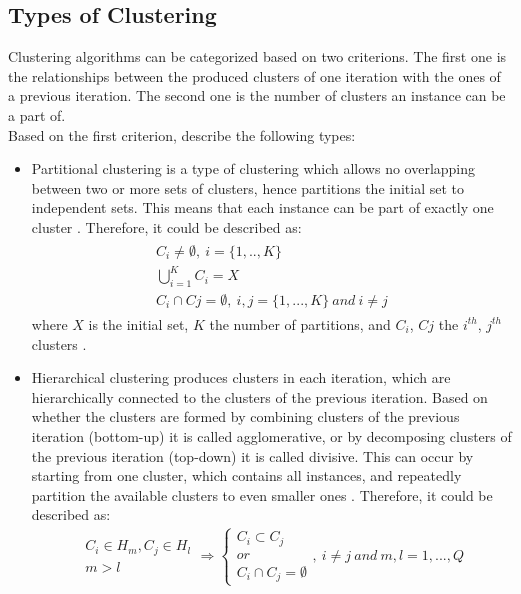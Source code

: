 \subsection{Types of Clustering}
Clustering algorithms can be categorized based on two criterions. The first one is the relationships between the produced clusters of one iteration with the ones of a previous iteration. The second one is the number of clusters an instance can be a part of. \\
Based on the first criterion, \textcite{tanSteinKum} describe the following types: \\
\begin{itemize}
\item Partitional clustering is a type of clustering which allows no overlapping between two or more sets of clusters, hence partitions the initial set to independent sets. This means that each instance can be part of exactly one cluster \autocite[492]{tanSteinKum}. Therefore, it could be described as:
\begin{eqnarray*}
\begin{array}{c}
C_{i} \neq \emptyset, \: i = \{1,..,K\} \\[4pt]
\bigcup_{i=1}^{K} C_{i}=X \\[4pt]
C_{i} \cap C{j} = \emptyset, \: i,j=\{1, ...,K\} \: and \: i \neq j
\end{array}
\end{eqnarray*}
where \(X\) is the initial set, \(K\) the number of partitions, and \(C_{i}\), \(C{j}\) the \(i^{th}\), \(j^{th}\) clusters \autocite[645]{survey}.
\item Hierarchical clustering produces clusters in each iteration, which are hierarchically connected to the clusters of the previous iteration. Based on whether the clusters are formed by combining clusters of the previous iteration (bottom-up) it is called agglomerative, or by decomposing clusters of the previous iteration (top-down) it is called divisive. This can occur by starting from one cluster, which contains all instances, and repeatedly partition the available clusters to even smaller ones \autocite[492]{tanSteinKum}. Therefore, it could be described as:
\begin{eqnarray*}
\left.\begin{array}{c}
C_{i} \in H_{m}, C_{j} \in H_{l} \\[4pt]
m>l
\end{array}\right. \Rightarrow
\left\{\begin{array}{c}
C_{i} \subset C_{j} \\
or \\
C_{i} \cap C_{j} = \emptyset
\end{array}\right.
, \: i \neq j \: and \: m,l = 1, ...,Q
\end{eqnarray*}
\end{itemize}
